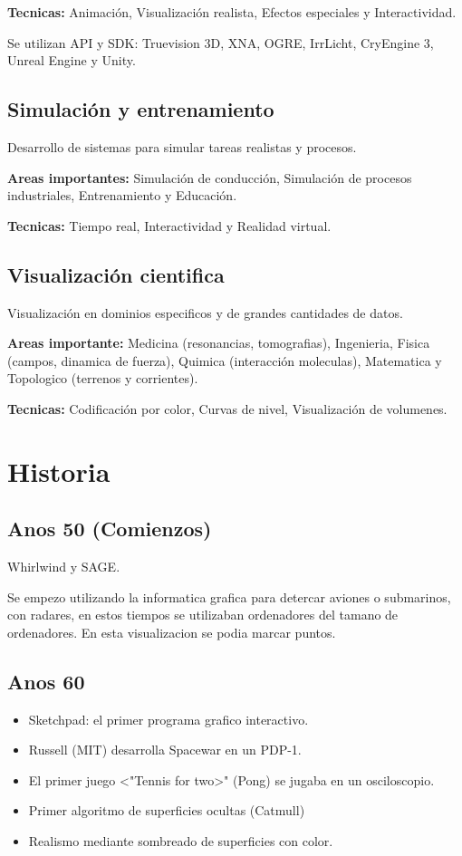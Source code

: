 \textbf{Tecnicas:} Animación, Visualización realista, Efectos especiales y Interactividad.

Se utilizan API y SDK: Truevision 3D, XNA, OGRE, IrrLicht, CryEngine 3, Unreal Engine y Unity.

\subsection{Simulación y entrenamiento}
Desarrollo de sistemas para simular tareas realistas y procesos.

\textbf{Areas importantes:} Simulación de conducción, Simulación de procesos industriales, Entrenamiento y Educación.

\textbf{Tecnicas:} Tiempo real, Interactividad y Realidad virtual.

\subsection{Visualización cientifica}
Visualización en dominios especificos y de grandes cantidades de datos.

\textbf{Areas importante:} Medicina (resonancias, tomografias), Ingenieria, Fisica (campos, dinamica de fuerza), Quimica (interacción moleculas), Matematica y Topologico (terrenos y corrientes).

\textbf{Tecnicas:} Codificación por color, Curvas de nivel, Visualización de volumenes.

\section{Historia}
\subsection{Anos 50 (Comienzos)}
Whirlwind y SAGE.

Se empezo utilizando la informatica grafica para detercar aviones o submarinos, con radares, en estos tiempos se utilizaban ordenadores del tamano de ordenadores. En esta visualizacion se podia marcar puntos.

\subsection{Anos 60}
\begin{itemize}
  \item Sketchpad: el primer programa grafico interactivo.
  \item Russell (MIT) desarrolla Spacewar en un PDP-1.
  \item El primer juego <"Tennis for two>" (Pong) se jugaba en un osciloscopio.
  \item Primer algoritmo de superficies ocultas (Catmull)
  \item Realismo mediante sombreado de superficies con color.
\end{itemize}

